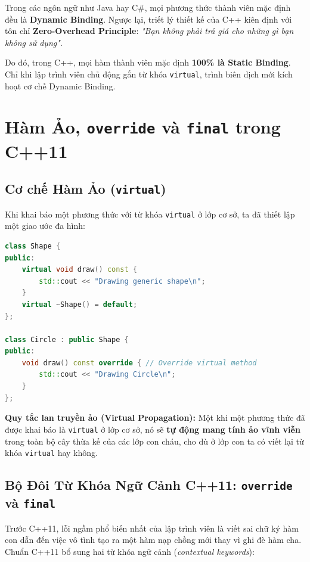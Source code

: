 \documentclass[12pt,a4paper,oneside]{book}
\begin{document}
\begin{theorybox}
Trong các ngôn ngữ như Java hay C\#, mọi phương thức thành viên mặc định đều là \textbf{Dynamic Binding}. Ngược lại, triết lý thiết kế của C++ kiên định với tôn chỉ \textbf{Zero-Overhead Principle}: \textit{"Bạn không phải trả giá cho những gì bạn không sử dụng"}. 

Do đó, trong C++, mọi hàm thành viên mặc định \textbf{100\% là Static Binding}. Chỉ khi lập trình viên chủ động gắn từ khóa \texttt{virtual}, trình biên dịch mới kích hoạt cơ chế Dynamic Binding.
\end{theorybox}

\section{Hàm Ảo, \texttt{override} và \texttt{final} trong C++11}

\subsection{Cơ chế Hàm Ảo (\texttt{virtual})}

Khi khai báo một phương thức với từ khóa \texttt{virtual} ở lớp cơ sở, ta đã thiết lập một giao ước đa hình:
\begin{lstlisting}[language=C++]
class Shape {
public:
    virtual void draw() const {
        std::cout << "Drawing generic shape\n";
    }
    virtual ~Shape() = default;
};

class Circle : public Shape {
public:
    void draw() const override { // Override virtual method
        std::cout << "Drawing Circle\n";
    }
};
\end{lstlisting}

\textbf{Quy tắc lan truyền ảo (Virtual Propagation):} Một khi một phương thức đã được khai báo là \texttt{virtual} ở lớp cơ sở, nó sẽ \textbf{tự động mang tính ảo vĩnh viễn} trong toàn bộ cây thừa kế của các lớp con cháu, cho dù ở lớp con ta có viết lại từ khóa \texttt{virtual} hay không.

\subsection{Bộ Đôi Từ Khóa Ngữ Cảnh C++11: \texttt{override} và \texttt{final}}

Trước C++11, lỗi ngầm phổ biến nhất của lập trình viên là viết sai chữ ký hàm con dẫn đến việc vô tình tạo ra một hàm nạp chồng mới thay vì ghi đè hàm cha. Chuẩn C++11 bổ sung hai từ khóa ngữ cảnh (\textit{contextual keywords}):
\end{document}
